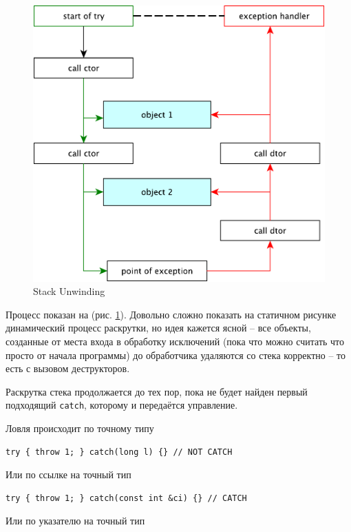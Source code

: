 \documentclass[a4paper,12pt,oneside]{book}
\begin{document}
\begin{figure}[ht]
\centering
\includegraphics[width=1.0\textwidth]{illustrations/stack-unwind-crop.pdf}
\caption{Stack Unwinding}
\label{fig:stack_unwind}
\end{figure}

Процесс показан на (рис. \ref{fig:stack_unwind}). Довольно сложно показать на статичном рисунке динамический процесс раскрутки, но идея кажется ясной -- все объекты, созданные от места входа в обработку исключений (пока что можно считать что просто от начала программы) до обработчика удаляются со стека корректно -- то есть с вызовом деструкторов.

Раскрутка стека продолжается до тех пор, пока не будет найден первый подходящий \lstinline!catch!, которому и передаётся управление.

Ловля происходит по точному типу

\begin{lstlisting}
try { throw 1; } catch(long l) {} // NOT CATCH
\end{lstlisting}

Или по ссылке на точный тип

\begin{lstlisting}
try { throw 1; } catch(const int &ci) {} // CATCH
\end{lstlisting}

Или по указателю на точный тип
\end{document}
